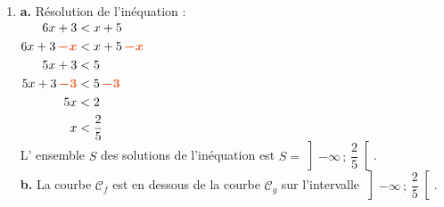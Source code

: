 \documentclass[a4paper,11pt]{article}
\begin{document}
\begin{seanceD}{}
\begin{enumerate}
\begin{enumerate}
\begin{tikzpicture}
\end{tikzpicture}
\item On cherche les réels qui sont à la fois dans $]-\infty;22]$ et dans $]31;40]$.On regarde la partie de l'intervalle qui est coloriée à la fois en bleu et en rouge. On observe que les deux intervalles sont disjoints donc aucun réel n'appartient aux deux ensembles.\\$I={\color[HTML]{f15929}\boldsymbol{\emptyset}}$.\\
\end{enumerate}

\item  \textbf {a.}  Résolution de l'inéquation :\\
              $\begin{aligned}
              6x+3&<x+5\\
              6x+3\,{\color[HTML]{f15929}\boldsymbol{-x}}&<x+5\,{\color[HTML]{f15929}\boldsymbol{-x}}\\
              5x+3&<5\\
              5x+3\,{\color[HTML]{f15929}\boldsymbol{-3}}&<5\,{\color[HTML]{f15929}\boldsymbol{-3}}\\
              5x&<2\\
            x&<\dfrac{2}{5}
              \end{aligned}$
              \\
              L'  ensemble $S$ des solutions de l'inéquation est
              $S= \left]-\infty\,;\,\dfrac{2}{5}\right[$.\\\textbf {b.}  
              La courbe $\mathscr{C}_f$ est en dessous de la courbe $\mathscr{C}_g$ sur l'intervalle $\left]-\infty\,;\,\dfrac{2}{5}\right[$.




\end{enumerate}
\end{seanceD}
\end{document}

